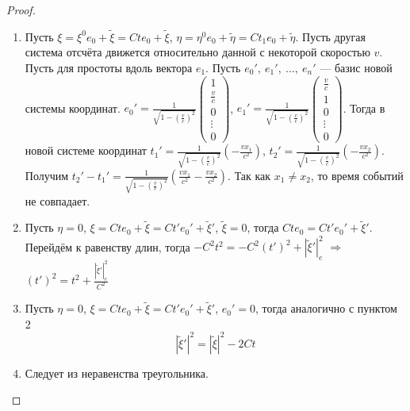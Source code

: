 \documentclass[12pt]{article}
\newcommand\tab[1][.5cm]{\hspace*{#1}}
\theoremstyle{plain}
\begin{document}
    \begin{proof}\tab
        \begin{enumerate}
            \item Пусть $\xi=\xi^0e_0+\tilde{\xi}=Cte_0+\tilde{\xi}$, $\eta=\eta^0e_0+\tilde{\eta}=Ct_1e_0+\tilde{\eta}$. Пусть другая система отсчёта движется относительно данной с некоторой скоростью $v$. Пусть для простоты вдоль вектора $e_1$. Пусть $e_0', \ e_1', \ \ldots, \ e_n'$ --- базис новой системы координат. $e_0'=\frac{1}{\sqrt{1-\left(\frac{v}{c}\right)^2}}\begin{pmatrix}
                1\\
                \frac{v}{c}\\
                0\\
                \vdots\\
                0
            \end{pmatrix}$, $e_1'=\frac{1}{\sqrt{1-\left(\frac{v}{c}\right)^2}}\begin{pmatrix}
                \frac{v}{c}\\
                1\\
                0\\
                \vdots\\
                0
            \end{pmatrix}$. Тогда в новой системе координат $t_1'=\frac{1}{\sqrt{1-\left(\frac{v}{c}\right)^2}}\left(-\frac{vx_1}{c^2}\right)$, $t_2'=\frac{1}{\sqrt{1-\left(\frac{v}{c}\right)^2}}\left(-\frac{vx_2}{c^2}\right)$. Получим $t_2'-t_1'=\frac{1}{\sqrt{1-\left(\frac{v}{c}\right)^2}}\left(\frac{vx_1}{c^2}-\frac{vx_2}{c^2}\right)$. Так как $x_1\neq x_2$, то время событий не совпадает.
            \item Пусть $\eta=0$, $\xi=Cte_0+\tilde{\xi}=Ct'e_0'+\tilde{\xi}'$, $\tilde{\xi}=0$, тогда $Cte_0=Ct'e_0'+\tilde{\xi}'$. Перейдём к равенству длин, тогда $-C^2t^2=-C^2(t')^2+|\tilde{\xi}'|^2_e$ $\Longrightarrow$ $(t')^2=t^2+\frac{|\tilde{\xi}'|^2_e}{C^2}$
            \item Пусть $\eta=0$, $\xi=Cte_0+\tilde{\xi}=Ct'e_0'+\tilde{\xi}'$, $e_0'=0$, тогда аналогично с пунктом 2 $$|\tilde{\xi}'|^2=|\tilde{\xi}|^2-2Ct$$
            \item Следует из неравенства треугольника.
        \end{enumerate}
    \end{proof}
\end{document}
